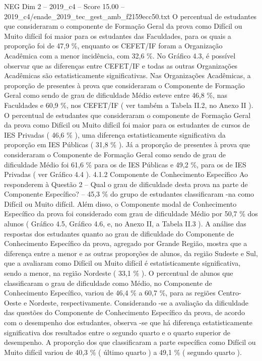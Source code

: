 \begin{textsample}{NEG Dim 2 – 2019\_c4 – Score 15.00 – 2019\_c4/enade\_2019\_tec\_gest\_amb\_f2159ecc50.txt}
O percentual de estudantes que consideraram o componente de Formação Geral da prova como Difícil ou Muito difícil foi maior para os estudantes das Faculdades, para os quais a proporção foi de 47,9 \%, enquanto os CEFET/IF foram a Organização Acadêmica com a menor incidência, com 32,6 \%.
No Gráfico 4.3, é possível observar que as diferenças entre CEFET/IF e todas as outras Organizações Acadêmicas são estatisticamente significativas.
Nas Organizações Acadêmicas, a proporção de presentes à prova que consideraram o Componente de Formação Geral como sendo de grau de dificuldade Médio esteve entre 46,8 \%, nas Faculdades e 60,9 \%, nos CEFET/IF ( ver também a Tabela II.2, no Anexo II ).
O percentual de estudantes que consideraram o componente de Formação Geral da prova como Difícil ou Muito difícil foi maior para os estudantes de cursos de IES Privadas ( 46,6 \% ), uma diferença estatisticamente significativa da proporção em IES Públicas ( 31,8 \% ).
Já a proporção de presentes à prova que consideraram o Componente de Formação Geral como sendo de grau de dificuldade Médio foi 61,6 \% para os de IES Públicas e 49,2 \%, para os de IES Privadas ( ver Gráfico 4.4 ). 4.1.2 Componente de Conhecimento Específico Ao responderem à Questão 2 – Qual o grau de dificuldade desta prova na parte de Componente Específico? – 45,3 \% do grupo de estudantes classificaram -na como Difícil ou Muito difícil.
Além disso, o Componente modal de Conhecimento Específico da prova foi considerado com grau de dificuldade Médio por 50,7 \% dos alunos ( Gráfico 4.5, Gráfico 4.6, e, no Anexo II, a Tabela II.3 ).
A análise das respostas dos estudantes quanto ao grau de dificuldade do Componente de Conhecimento Específico da prova, agregado por Grande Região, mostra que a diferença entre a menor e as outras proporções de alunos, da região Sudeste e Sul, que a avaliaram como Difícil ou Muito difícil é estatisticamente significativa, sendo a menor, na região Nordeste ( 33,1 \% ).
O percentual de alunos que classificaram o grau de dificuldade como Médio, no Componente de Conhecimento Específico, variou de 46,4 \% a 60,7 \%, para as regiões Centro-Oeste e Nordeste, respectivamente.
Considerando -se a avaliação da dificuldade das questões do Componente de Conhecimento Específico da prova, de acordo com o desempenho dos estudantes, observa -se que há diferença estatisticamente significativa dos resultados entre o segundo quarto e o quarto superior de desempenho.
A proporção dos que classificaram a parte específica como Difícil ou Muito difícil variou de 40,3 \% ( último quarto ) a 49,1 \% ( segundo quarto ).

\end{textsample}
